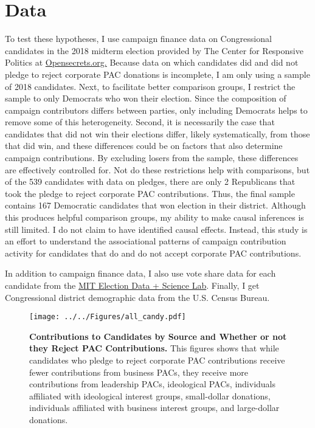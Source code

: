 \documentclass[12pt]{article}
\begin{document}
\section{Data}

To test these hypotheses, I use campaign finance data on Congressional candidates in the 2018 midterm election provided by The Center for Responsive Politics at \href{https://www.opensecrets.org}{Opensecrets.org.} Because data on which candidates did and did not pledge to reject corporate PAC donations is incomplete, I am only using a sample of 2018 candidates. Next, to facilitate better comparison groups, I restrict the sample to only Democrats who won their election. Since the composition of campaign contributors differs between parties, only including Democrats helps to remove some of this heterogeneity. Second, it is necessarily the case that candidates that did not win their elections differ, likely systematically, from those that did win, and these differences could be on factors that also determine campaign contributions. By excluding losers from the sample, these differences are effectively controlled for. Not do these restrictions help with comparisons, but of the 539 candidates with data on pledges, there are only 2 Republicans that took the pledge to reject corporate PAC contributions. Thus, the final sample contains 167 Democratic candidates that won election in their district. Although this produces helpful comparison groups, my ability to make causal inferences is still limited. I do not claim to have identified causal effects. Instead, this study is an effort to understand the associational patterns of campaign contribution activity for candidates that do and do not accept corporate PAC contributions. 

In addition to campaign finance data, I also use vote share data for each candidate from the \href{https://electionlab.mit.edu/data}{MIT Election Data + Science Lab}. Finally, I get Congressional district demographic data from the U.S. Census Bureau.  

\begin{figure}[!htb]
    \centering
    \texttt{[image: ../../Figures/all\_candy.pdf]}
    \caption{\textbf{Contributions to Candidates by Source and Whether or not they Reject PAC Contributions.} This figures shows that while candidates who pledge to reject corporate PAC contributions receive fewer contributions from business PACs, they receive more contributions from leadership PACs, ideological PACs, individuals affiliated with ideological interest groups, small-dollar donations, individuals affiliated with business interest groups, and large-dollar donations.}
    \label{fig: all contribs}
\end{figure}
\end{document}
